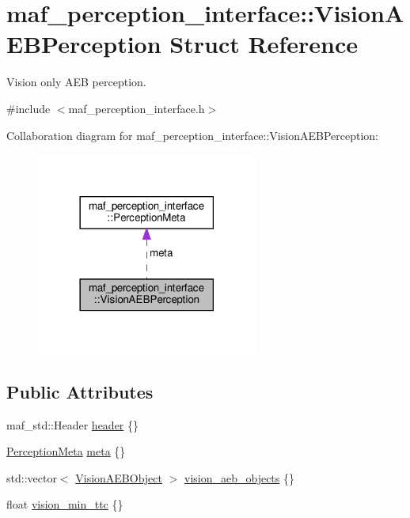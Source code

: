 \hypertarget{structmaf__perception__interface_1_1VisionAEBPerception}{}\section{maf\+\_\+perception\+\_\+interface\+:\+:Vision\+A\+E\+B\+Perception Struct Reference}
\label{structmaf__perception__interface_1_1VisionAEBPerception}


Vision only A\+EB perception.  




{\ttfamily \#include $<$maf\+\_\+perception\+\_\+interface.\+h$>$}



Collaboration diagram for maf\+\_\+perception\+\_\+interface\+:\+:Vision\+A\+E\+B\+Perception\+:\nopagebreak
\begin{figure}[H]
\begin{center}
\leavevmode
\includegraphics[width=206pt]{structmaf__perception__interface_1_1VisionAEBPerception__coll__graph}
\end{center}
\end{figure}
\subsection*{Public Attributes}
\begin{DoxyCompactItemize}
\item 
maf\+\_\+std\+::\+Header \hyperlink{structmaf__perception__interface_1_1VisionAEBPerception_acd3265f7bf688bb6608f9c628431645e}{header} \{\}
\item 
\hyperlink{structmaf__perception__interface_1_1PerceptionMeta}{Perception\+Meta} \hyperlink{structmaf__perception__interface_1_1VisionAEBPerception_a655d2cc77fcfcf10795f4d1d0c2de44e}{meta} \{\}
\item 
std\+::vector$<$ \hyperlink{structmaf__perception__interface_1_1VisionAEBObject}{Vision\+A\+E\+B\+Object} $>$ \hyperlink{structmaf__perception__interface_1_1VisionAEBPerception_a180e036616b9f8ad3860293516f3b804}{vision\+\_\+aeb\+\_\+objects} \{\}
\item 
float \hyperlink{structmaf__perception__interface_1_1VisionAEBPerception_aa9bcee4c8754d7b71ffe4f1f5f88841c}{vision\+\_\+min\+\_\+ttc} \{\}
\end{DoxyCompactItemize}


